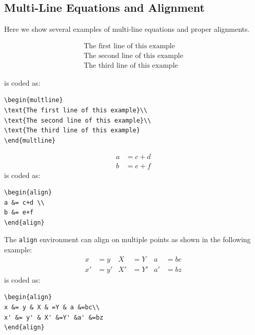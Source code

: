 \subsection{Multi-Line Equations and Alignment}
Here we show several examples of multi-line equations and proper alignments.

\begin{multline}
\text{The first line of this example}\\
\text{The second line of this example}\\
\text{The third line of this example}
\end{multline}

\noindent is coded as:
\begin{verbatim}
\begin{multline}
\text{The first line of this example}\\
\text{The second line of this example}\\
\text{The third line of this example}
\end{multline}
\end{verbatim}

\begin{align}
a &= c+d \\
b &= e+f
\end{align}
\noindent is coded as:
\begin{verbatim}
\begin{align}
a &= c+d \\
b &= e+f
\end{align}
\end{verbatim}

The {\tt{align}} environment can align on multiple  points as shown in the following example:
\begin{align}
x &= y & X & =Y & a &=bc\\
x' &= y' & X' &=Y' &a' &=bz
\end{align}
\noindent is coded as:
\begin{verbatim}
\begin{align}
x &= y & X & =Y & a &=bc\\
x' &= y' & X' &=Y' &a' &=bz
\end{align}
\end{verbatim}





